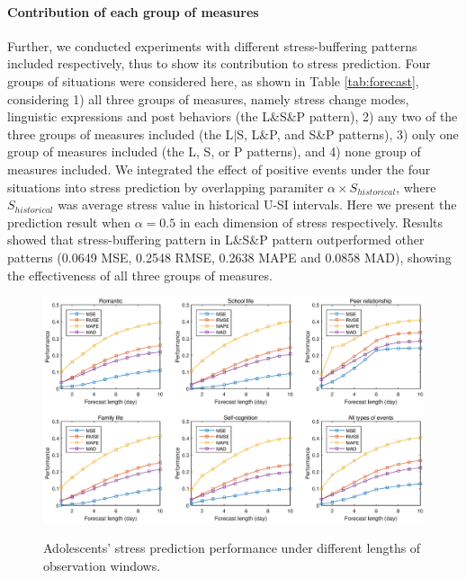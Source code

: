 \paragraph{Contribution of each group of measures}
Further,
we conducted experiments with different stress-buffering patterns included respectively,
thus to show its contribution to stress prediction.
Four groups of situations were considered here, as shown in Table \ref{tab:forecast},
considering
1) all three groups of measures, namely stress change modes, linguistic expressions and post behaviors (the L\&S\&P pattern),
2) any two of the three groups of measures included (the L$|$S, L\&P, and S\&P patterns),
3) only one group of measures included (the L, S, or P patterns),
and 4) none group of measures included.
We integrated the effect of positive events under the four situations into stress prediction by overlapping paramiter $\alpha \times S_{historical}$,
where $S_{historical}$ was average stress value in historical U-SI intervals.
Here we present the prediction result when $\alpha = 0.5$ in each dimension of stress respectively.
Results showed that stress-buffering pattern in L\&S\&P pattern outperformed other patterns
(0.0649 MSE, 0.2548 RMSE, 0.2638 MAPE and 0.0858 MAD),
showing the effectiveness of all three groups of measures.
\begin{figure}
\centering
\caption{Adolescents' stress prediction performance under different lengths of observation windows.}
\includegraphics[width=\linewidth]{figs/predictWindow2.eps}
\label{fig:length}
\end{figure}

